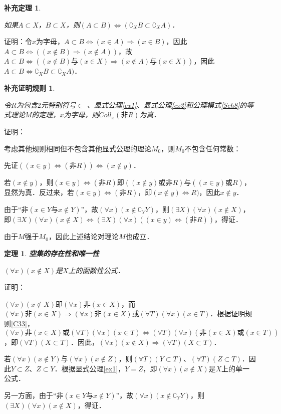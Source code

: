 \documentclass[12pt, a4paper, oneside]{book}
\newtheorem{Ccor}{补充证明规则}
\newtheorem{theo}{定理}
\newtheorem{cor}{补充定理}
\begin{document}
			\begin{cor}\label{cor13}
				\hfill\par
				如果$A\subset X$，$B\subset X$，则$(A\subset B)\Leftrightarrow (\complement_XB\subset \complement_XA)$．
			\end{cor}
			证明：令$x$为字母，$A\subset B\Leftrightarrow (x\in A)\Rightarrow (x\in B)$，因此$A\subset B\Leftrightarrow ((x\notin B)\Rightarrow (x\notin A))$，故$A\subset B\Leftrightarrow ((x\notin B)\text{与}(x\in X)\Rightarrow (x\notin A)\text{与}(x\in X))$，因此$A\subset B\Leftrightarrow \complement_XB\subset \complement_XA)$．
			
			\begin{Ccor}\label{Ccor14}
				\hfill\par
				令$R$为包含$2$元特别符号$\in$ 、显式公理\ref{ex1}、显式公理\ref{ex2}和公理模式\ref{Sch8}的等式理论$M$的定理，$x$为字母，则$Coll_x(\text{非}R)$为真．
			\end{Ccor}
			证明：
			\par
			考虑其他规则相同但不包含其他显式公理的理论$M_0$，则$M_0$不包含任何常数：
			\par
			先证$((x\in y)\Leftrightarrow (\text{非}R))\Leftrightarrow (x\notin y)$．
			\par
			若$(x\notin y)$，则$(x\in y)\Leftrightarrow (\text{非}R)$即$((x\notin y)\text{或}\text{非}R)\text{与}((x\in y)\text{或}R)$，显然为真．反过来，若$(x\in y)\Leftrightarrow (\text{非}R)$，即$(x\notin y)\Leftrightarrow R)$，因此$x\notin y$．
			\par
			由于“$\text{非}(x\in Y\text{与}x\notin Y)$”，故$(\forall x)(x\notin \complement_YY)$，则$(\exists X)(\forall x)(x\notin X)$，即$(\exists X)(\forall x)(x\notin X)\Leftrightarrow (\exists X)(\forall x)((x\in y)\Leftrightarrow (\text{非}R))$，得证．
			\par
			由于$M$强于$M_0$，因此上述结论对理论$M$也成立．

			\begin{theo}\label{theo6}
				\textbf{空集的存在性和唯一性}
				\par
				$(\forall x)(x\notin X)$是$X$上的函数性公式．
			\end{theo}
			证明：
			\par
			$(\forall x)(x\notin X)$即$(\forall x)\text{非}(x\in X)$，而$(\forall x)\text{非}(x\in X)\Rightarrow (\forall x)\text{非}(x\in X)\text{或}(\forall T)(\forall x)(x\in T)$．根据证明规则\ref{C33}，$(\forall x)\text{非}(x\in X)\text{或}(\forall T)(\forall x)(x\in T)\Leftrightarrow (\forall T)(\forall x)(\text{非}(x\in X)\text{或}(x\in T))$，即$(\forall T)(X\subset T)$．因此，$(\forall x)(x\notin X)\Rightarrow (\forall T)(X\subset T)$．
			\par
			若$(\forall x)(x\notin Y)\text{与}(\forall x)(x\notin Z)$，则$(\forall T)(Y\subset T)$、$(\forall T)(Z\subset T)$．因此$Y\subset Z$、$Z\subset Y$．根据显式公理\ref{ex1}，$Y=Z$，即$(\forall x)(x\notin X)$是$X$上的单一公式．
			\par
			另一方面，由于“$\text{非}(x\in Y\text{与}x\notin Y)$”，故$(\forall x)(x\notin \complement_YY)$，则$(\exists X)(\forall x)(x\notin X)$，得证．
\end{document}
